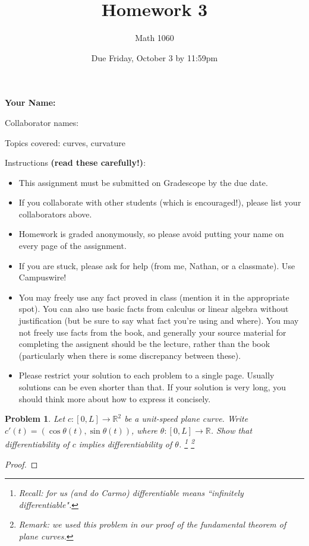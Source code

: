 \documentclass[11pt]{article}
\author{Math 1060}
\date{Due Friday, October 3 by 11:59pm}
\title{Homework 3}
\newtheorem{problem}{Problem}
\begin{document}
\maketitle


{\bf\Large Your Name:} 

Collaborator names: 


\vspace{.3in}
Topics covered: curves, curvature

Instructions {\bf (read these carefully!)}: 
\begin{itemize}
\item This assignment must be submitted on Gradescope by the due date. 
\item If you collaborate with other students (which is encouraged!), please list your collaborators above. 
\item Homework is graded anonymously, so please avoid putting your name on every page of the assignment.
\item If you are stuck, please ask for help (from me, Nathan, or a classmate). Use Campuswire!  
\item You may freely use any fact proved in class (mention it in the appropriate spot). You can also use basic facts from calculus or linear algebra without justification (but be sure to say what fact you're using and where). You may not freely use facts from the book, and generally your source material for completing the assignent should be the lecture, rather than the book (particularly when there is some discrepancy between these). 
\item Please restrict your solution to each problem to a single page. Usually solutions can be even shorter than that. If your solution is very long, you should think more about how to express it concisely.
\end{itemize}
\pagebreak 


\begin{problem}
Let $c:[0,L]\to\mathbb R^2$ be a unit-speed plane curve. Write $c'(t)=(\cos\theta(t),\sin\theta(t))$, where $\theta:[0,L]\to\mathbb R$. Show that differentiability of $c$ implies differentiability of $\theta$. \footnote{Recall: for us (and do Carmo) differentiable means ``infinitely differentiable".} \footnote{Remark: we used this problem in our proof of the fundamental theorem of plane curves.}
\end{problem}

\begin{proof}

\end{proof}
\end{document}
